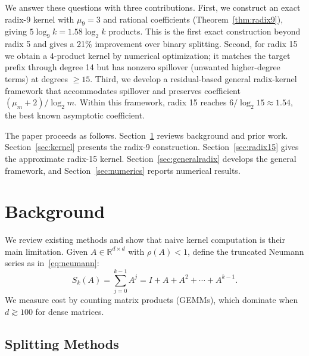 \documentclass[
  journal=largetwo,
  manuscript=article,
  manuscriptlabel={Research Preprint},
  logo=false,
  simfonts=false,
  year=2026,
  volume=1,
]{cup-journal}
\theoremstyle{definition}
\theoremstyle{remark}
\begin{document}
We answer these questions with three contributions.
First, we construct an exact radix-9 kernel with $\mu_9 = 3$ and rational
coefficients (Theorem~\ref{thm:radix9}), giving
$5\log_9 k = 1.58\log_2 k$ products.
This is the first exact construction beyond radix 5 and gives a 21\% improvement
over binary splitting.
Second, for radix 15 we obtain a 4-product kernel by numerical optimization; it
matches the target prefix through degree 14 but has nonzero spillover
(unwanted higher-degree terms) at degrees $\ge 15$.
Third, we develop a residual-based general radix-kernel framework that
accommodates spillover and preserves coefficient $(\mu_m+2)/\log_2 m$.
Within this framework, radix 15 reaches $6/\log_2 15 \approx 1.54$, the best
known asymptotic coefficient.

The paper proceeds as follows.
Section~\ref{sec:preliminaries} reviews background and prior work.
Section~\ref{sec:kernel} presents the radix-9 construction.
Section~\ref{sec:radix15} gives the approximate radix-15 kernel.
Section~\ref{sec:generalradix} develops the general framework, and
Section~\ref{sec:numerics} reports numerical results.


\section{Background}
\label{sec:preliminaries}

We review existing methods and show that naive kernel computation is their
main limitation.
Given $A \in \mathbb{R}^{d \times d}$ with $\rho(A) < 1$, define the
truncated Neumann series as in~\eqref{eq:neumann}:
\begin{equation}
  \label{eq:series}
  S_k(A) = \sum_{j=0}^{k-1} A^j = I + A + A^2 + \cdots + A^{k-1}.
\end{equation}
We measure cost by counting matrix products (GEMMs), which dominate
when $d \gtrsim 100$ for dense matrices.

\subsection{Splitting Methods}
\end{document}

